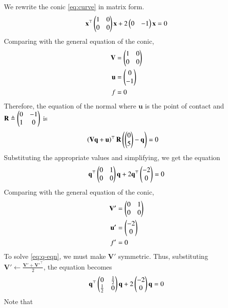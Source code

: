 \documentclass[journal,12pt,twocolumn]{IEEEtran}
\renewcommand{\vec}[1]{\boldsymbol{\mathbf{#1}}}
\begin{document}
\begin{enumerate}
    \solution We rewrite the conic \eqref{eq:curve} in matrix form.
    \begin{align}
        \vec{x}^\top\myvec{1&0\\0&0}\vec{x} + 2\myvec{0&-1}\vec{x} = 0
        \label{eq:curve-mtx}
    \end{align}
    Comparing with the general equation of the conic,
    \begin{align}
        \vec{V} &= \myvec{1&0\\0&0} \label{eq:V-val} \\
        \vec{u} &= \myvec{0\\-1} \label{eq:u-val} \\
        f &= 0 \label{eq:f-val}
    \end{align}
    Therefore, the equation of the normal where $\vec{u}$ is the point of contact 
    and $\vec{R} \triangleq \myvec{0&-1\\1&0}$ is
    \begin{align}
        \brak{\vec{Vq}+\vec{u}}^\top\vec{R}\brak{\myvec{0\\5}-\vec{q}} &= 0
        \label{eq:normal}
    \end{align}
    Substituting the appropriate values and simplifying, we get the equation
    \begin{align}
        \vec{q}^\top\myvec{0&1\\0&0}\vec{q} + 2\vec{q}^\top\myvec{-2\\0} = 0
        \label{eq:q-eqn}
    \end{align}
    Comparing with the general equation of the conic,
    \begin{align}
        \vec{V'} &= \myvec{0&1\\0&0} \label{eq:V-q-val} \\
        \vec{u'} &= \myvec{-2\\0} \label{eq:u-q-val} \\
        f' &= 0 \label{eq:f-q-val}
    \end{align}
    To solve \eqref{eq:q-eqn}, we must make $\vec{V'}$ symmetric. Thus,
    substituting $\vec{V'} \leftarrow \frac{\vec{V'}+\vec{V'}^\top}{2}$,
    the equation becomes
    \begin{align}
        \vec{q}^\top\myvec{0&\frac{1}{2}\\\frac{1}{2}&0}\vec{q} + 2\myvec{-2\\0}\vec{q} = 0
        \label{eq:q-affine}
    \end{align}
    Note that
    \begin{align}

\end{align}
\end{enumerate}
\end{document}
